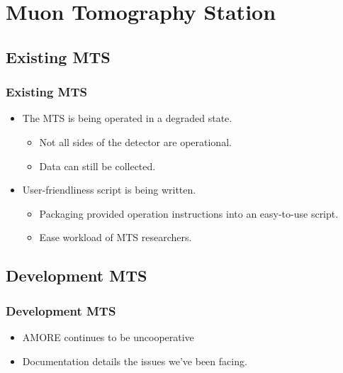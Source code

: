 \documentclass[aspectratio=169]{beamer}
\begin{document}
\section{Muon Tomography Station}


\subsection{Existing MTS}

\begin{frame}

  \frametitle{Existing MTS}

  \begin{itemize}
  \item The MTS is being operated in a degraded state.
    \begin{itemize}
    \item Not all sides of the detector are operational.
    \item Data can still be collected.
    \end{itemize}
  \item User-friendliness script is being written.
    \begin{itemize}
    \item Packaging provided operation instructions into an easy-to-use
      script.
    \item Ease workload of MTS researchers.
    \end{itemize}
  \end{itemize}

\end{frame}



\subsection{Development MTS}

\begin{frame}

  \frametitle{Development MTS}

  \begin{itemize}
    \item AMORE continues to be uncooperative
    \item Documentation details the issues we've been facing.
  \end{itemize}

\end{frame}
\end{document}
